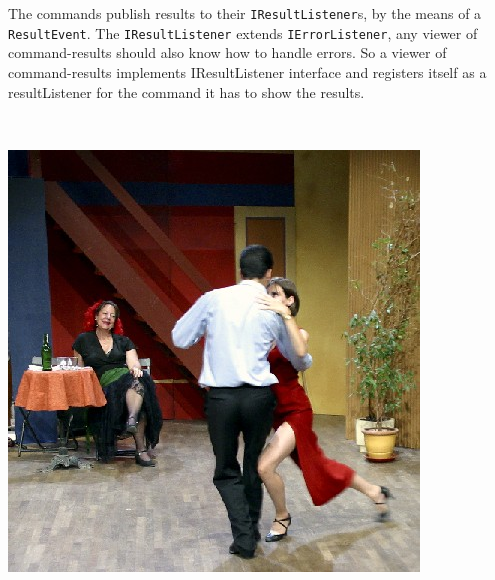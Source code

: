 The commands publish results to their \texttt{IResultListener}s, by
the means of a \texttt{ResultEvent}. The \texttt{IResultListener}
extends \texttt{IErrorListener}, any viewer of command-results
should also know how to handle errors. So a viewer of command-results
implements IResultListener interface and registers itself as a resultListener
for the command it has to show the results.
\begin{lyxcode}
~




\end{lyxcode}
\begin{center}
\label{TwoRicardo}\includegraphics[scale=4]{dance/0046-reduc}
\par\end{center}
